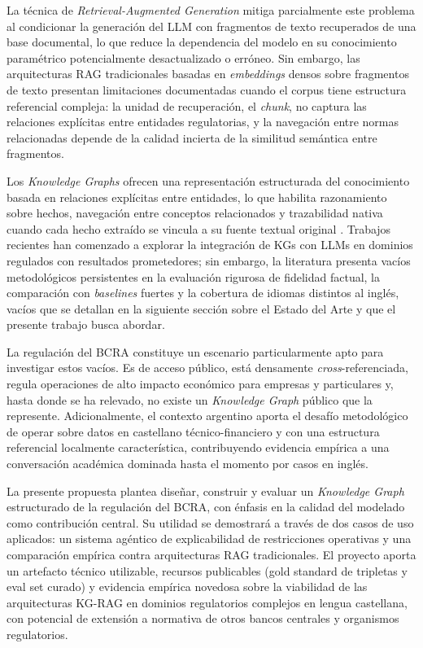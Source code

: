\documentclass[12pt,a4paper]{article}
\begin{document}
La técnica de \textit{Retrieval-Augmented Generation} \cite{lewis2020rag} mitiga parcialmente este problema al condicionar la generación del LLM con fragmentos de texto recuperados de una base documental, lo que reduce la dependencia del modelo en su conocimiento paramétrico potencialmente desactualizado o erróneo. Sin embargo, las arquitecturas RAG tradicionales basadas en \textit{embeddings} densos sobre fragmentos de texto presentan limitaciones documentadas cuando el corpus tiene estructura referencial compleja: la unidad de recuperación, el \textit{chunk}, no captura las relaciones explícitas entre entidades regulatorias, y la navegación entre normas relacionadas depende de la calidad incierta de la similitud semántica entre fragmentos.

Los \textit{Knowledge Graphs} ofrecen una representación estructurada del conocimiento basada en relaciones explícitas entre entidades, lo que habilita razonamiento sobre hechos, navegación entre conceptos relacionados y trazabilidad nativa cuando cada hecho extraído se vincula a su fuente textual original \cite{hogan2021knowledge}. Trabajos recientes han comenzado a explorar la integración de KGs con LLMs en dominios regulados con resultados prometedores; sin embargo, la literatura presenta vacíos metodológicos persistentes en la evaluación rigurosa de fidelidad factual, la comparación con \textit{baselines} fuertes y la cobertura de idiomas distintos al inglés, vacíos que se detallan en la siguiente sección sobre el Estado del Arte y que el presente trabajo busca abordar.
 
La regulación del BCRA constituye un escenario particularmente apto para investigar estos vacíos. Es de acceso público, está densamente \textit{cross}-referenciada, regula operaciones de alto impacto económico para empresas y particulares y, hasta donde se ha relevado, no existe un \textit{Knowledge Graph} público que la represente. Adicionalmente, el contexto argentino aporta el desafío metodológico de operar sobre datos en castellano técnico-financiero y con una estructura referencial localmente característica, contribuyendo evidencia empírica a una conversación académica dominada hasta el momento por casos en inglés.

La presente propuesta plantea diseñar, construir y evaluar un \textit{Knowledge Graph} estructurado de la regulación del BCRA, con énfasis en la calidad del modelado como contribución central. Su utilidad se demostrará a través de dos casos de uso aplicados: un sistema agéntico de explicabilidad de restricciones operativas y una comparación empírica contra arquitecturas RAG tradicionales. El proyecto aporta un artefacto técnico utilizable, recursos publicables (gold standard de tripletas y eval set curado) y evidencia empírica novedosa sobre la viabilidad de las arquitecturas KG-RAG en dominios regulatorios complejos en lengua castellana, con potencial de extensión a normativa de otros bancos centrales y organismos regulatorios.
 
\end{document}
